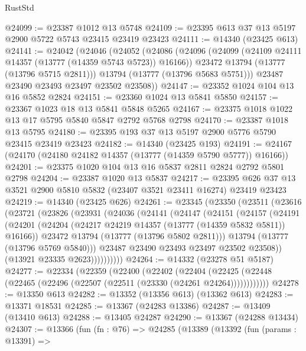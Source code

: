 \begin{lexlean}{RustStd}
\begin{coremodule}
@24099 := @23387 @1012 @13 @5748
@24109 := @23395 @613 @37 @13 @5197 @2900 @5722 @5743 @23415 @23419 @23423
@24111 := @14340 (@23425 @613)
@24141 := @24042
    (@24046
      (@24052
        (@24086
          (@24096
            (@24099 (@24109 @24111 @14357 (@13777 (@14359 @5743 @5723)) @16166))
            @23472
            @13794
            (@13777 (@13796 @5715 @2811)))
          @13794
          (@13777 (@13796 @5683 @5751)))
        @23487
        @23490
        @23493
        @23497
        @23502
        @23508))
@24147 := @23352 @1024 @104 @13 @16 @5852 @2824
@24151 := @23360 @1024 @13 @5841 @5850
@24157 := @23367 @1023 @18 @13 @5841 @5848 @5265
@24167 := @23375 @1018 @1022 @13 @17 @5795 @5840 @5847 @2792 @5768 @2798
@24170 := @23387 @1018 @13 @5795
@24180 := @23395 @193 @37 @13 @5197 @2900 @5776 @5790 @23415 @23419 @23423
@24182 := @14340 (@23425 @193)
@24191 := @24167 (@24170 (@24180 @24182 @14357 (@13777 (@14359 @5790 @5777)) @16166))
@24201 := @23375 @1020 @104 @13 @16 @5837 @2811 @2824 @2792 @5801 @2798
@24204 := @23387 @1020 @13 @5837
@24217 := @23395 @626 @37 @13 @3521 @2900 @5810 @5832 (@23407 @3521 @23411 @16274) @23419 @23423
@24219 := @14340 (@23425 @626)
@24261 := @23345
    (@23350
      (@23511
        (@23616
          (@23721
            (@23826
              (@23931
                (@24036
                  (@24141
                    (@24147
                      (@24151
                        (@24157
                          (@24191
                            (@24201
                              (@24204 (@24217 @24219 @14357 (@13777 (@14359 @5832 @5811)) @16166))
                              @23472
                              @13794
                              (@13777 (@13796 @5802 @2811)))
                            @13794
                            (@13777 (@13796 @5769 @5840)))
                          @23487
                          @23490
                          @23493
                          @23497
                          @23502
                          @23508))
                      (@13921 @23335 @2623))))))))))
@24264 := @14332 (@23278 @51 @5187)
@24277 := @22334
    (@22359
      (@22400
        (@22402
          (@22404 (@22425 (@22448 (@22465 (@22496 (@22507 (@22511 (@23330 (@24261 @24264))))))))))))
@24278 := @13350 @613
@24282 := @13352 (@13356 @613) (@13362 @613)
@24283 := @13371 @18531
@24285 := @13367 (@24283 @13386)
@24287 := @13409 (@13410 @613)
@24288 := @13405 @24287
@24290 := @13367 (@24288 @13434)
@24307 := @13366
    (fun (fn : @76) =>
    @24285
      (@13389
        (@13392
          (fun (params : @13391) =>

\end{coremodule}
\end{lexlean}
